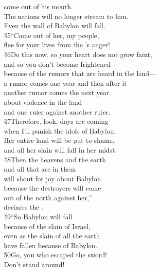 \begin{poetry}
\poemlll       come out of his mouth. \\
\poeml The nations will no longer stream to him. \\
\poemll    Even the wall of Babylon will fall. \\
\poeml \v{45}``Come out of her, my people, \\
\poemll    flee for your lives from the 's anger! \\
\poeml \v{46}Do this now, so your heart does not grow faint, \\
\poemll    and so you don't become frightened \\
\poemlll       because of the rumors that are heard in the land--- \\
\poeml a rumor comes one year and then after it \\
\poemll    another rumor comes the next year \\
\poeml about violence in the land \\
\poemll    and one ruler against another ruler. \\
\poeml \v{47}Therefore, look, days are coming \\
\poemll    when I'll punish the idols of Babylon. \\
\poeml Her entire land will be put to shame, \\
\poemll    and all her slain will fall in her midst. \\
\poeml \v{48}Then the heavens and the earth \\
\poemll    and all that are in them \\
\poemlll       will shout for joy about Babylon \\
\poeml because the destroyers will come \\
\poemll    out of the north against her,'' \\
\poemlll       declares the . \\
\poeml \v{49}``So Babylon will fall \\
\poemll    because of the slain of Israel, \\
\poeml even as the slain of all the earth \\
\poemll    have fallen because of Babylon. \\
\poeml \v{50}Go, you who escaped the sword! \\
\poemll    Don't stand around! \\

\end{poetry}
